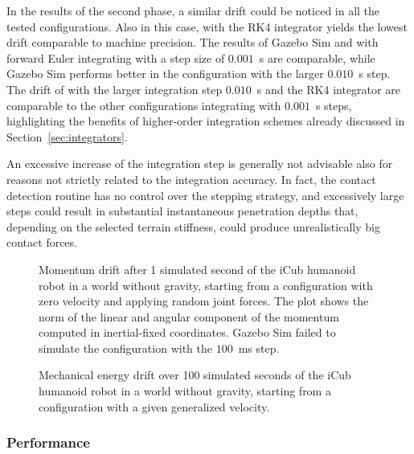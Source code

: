 In the results of the second phase, a similar drift could be noticed in all the tested configurations.
Also in this case, \jaxsim with the \ac{RK4} integrator yields the lowest drift comparable to machine precision.
The results of Gazebo Sim and \jaxsim with forward Euler integrating with a step size of $0.001$~s are comparable, while Gazebo Sim performs better in the configuration with the larger $0.010$~s step.
The drift of \jaxsim with the larger integration step $0.010$~s and the \ac{RK4} integrator are comparable to the other configurations integrating with $0.001$~s steps, highlighting the benefits of higher-order integration schemes already discussed in Section~\ref{sec:integrators}.

An excessive increase of the integration step is generally not advisable also for reasons not strictly related to the integration accuracy.
In fact, the contact detection routine has no control over the stepping strategy, and excessively large steps could result in substantial instantaneous penetration depths that, depending on the selected terrain stiffness, could produce unrealistically big contact forces.

\begin{figure}
    \centering
    \caption{Momentum drift after 1 simulated second of the iCub humanoid robot in a world without gravity, starting from a configuration with zero velocity and applying random joint forces. The plot shows the norm of the linear and angular component of the momentum computed in inertial-fixed coordinates. Gazebo Sim failed to simulate the configuration with the $100$~ms step.}
    \label{fig:jaxsim_conservation_momentum}
\end{figure}

\begin{figure}
    \centering
    \caption{Mechanical energy drift over 100 simulated seconds of the iCub humanoid robot in a world without gravity, starting from a configuration with a given generalized velocity.}
    \label{fig:jaxsim_conservation_energy}
\end{figure}

\subsubsection{Performance}


